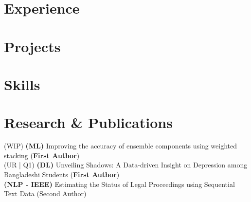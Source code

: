 \documentclass[letterpaper,11pt]{article}
\newcommand{\resumeSubHeadingListStart}{\begin{itemize}[leftmargin=0.15in, label={}]}
\newcommand{\resumeSubHeadingListEnd}{\end{itemize}}
\begin{document}





\section{Experience
 }
\resumeSubHeadingListStart







\resumeSubHeadingListEnd


\section{Projects
 }
\resumeSubHeadingListStart




\resumeSubHeadingListEnd



%
\section{Skills
 }
\begin{itemize}[leftmargin=0.15in, label={}]
  \small{\item{
                
                
                
                
          }}
\end{itemize}


\section{Research \& Publications}
\begin{itemize}[leftmargin=0.15in, label={}]
  \small{\item{
                (WIP) \textbf{(ML)}{ Improving the accuracy of ensemble components using weighted stacking (\textbf{First Author})} \\
                (UR | Q1) \textbf{(DL)}{ Unveiling Shadows: A Data-driven Insight on Depression among Bangladeshi  Students (\textbf{First Author})} \\
                \textbf{(NLP - IEEE)}{ Estimating the Status of Legal Proceedings using Sequential Text Data (Second Author)} \\
          }}
\end{itemize}
\end{document}
